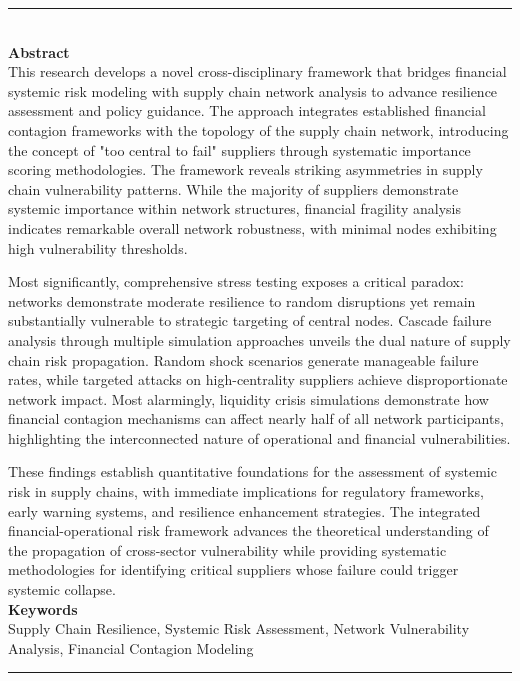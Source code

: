 \documentclass[a4 paper, 11pt,twoside]{article}
\newcommand{\0}{\Bf{0}}
\theoremstyle{definition}
\begin{document}
{\color{Brown}\rule{0.7\textwidth}{2pt}}\\[0.2cm]
{\color{Brown}\bf\large Abstract}\\
This research develops a novel cross-disciplinary framework that bridges financial systemic risk modeling with supply chain network analysis to advance resilience assessment and policy guidance. The approach integrates established financial contagion frameworks with the topology of the supply chain network, introducing the concept of "too central to fail" suppliers through systematic importance scoring methodologies. The framework reveals striking asymmetries in supply chain vulnerability patterns. While the majority of suppliers demonstrate systemic importance within network structures, financial fragility analysis indicates remarkable overall network robustness, with minimal nodes exhibiting high vulnerability thresholds.

Most significantly, comprehensive stress testing exposes a critical paradox: networks demonstrate moderate resilience to random disruptions yet remain substantially vulnerable to strategic targeting of central nodes. Cascade failure analysis through multiple simulation approaches unveils the dual nature of supply chain risk propagation. Random shock scenarios generate manageable failure rates, while targeted attacks on high-centrality suppliers achieve disproportionate network impact. Most alarmingly, liquidity crisis simulations demonstrate how financial contagion mechanisms can affect nearly half of all network participants, highlighting the interconnected nature of operational and financial vulnerabilities.

These findings establish quantitative foundations for the assessment of systemic risk in supply chains, with immediate implications for regulatory frameworks, early warning systems, and resilience enhancement strategies. The integrated financial-operational risk framework advances the theoretical understanding of the propagation of cross-sector vulnerability while providing systematic methodologies for identifying critical suppliers whose failure could trigger systemic collapse.
\vspace{0.5cm}\\
{\color{Brown}\bf\large Keywords}\\
Supply Chain Resilience, Systemic Risk Assessment, Network Vulnerability Analysis, Financial Contagion Modeling
\vspace{0cm}\\
{\color{Brown}\rule{0.7\textwidth}{2pt}}
\end{document}
